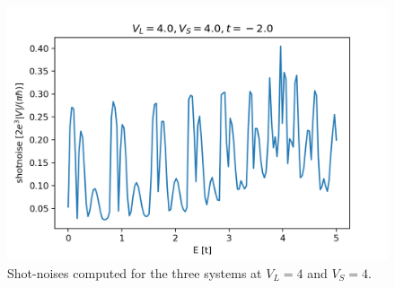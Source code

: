 \documentclass[12pt]{article}
\numberwithin{equation}{section}
\begin{document}
\begin{figure}
  \begin{minipage}{0.333\textwidth}
    \centering
    \includegraphics[width=1.0\textwidth]{./media/shotnoise_2deg_W8_L10_VL4_0_VS4_0.png} %
  \end{minipage}
  \caption{Shot-noises computed for the three systems at $V_L=4$ and $V_S=4$.}
\end{figure}
\end{document}
